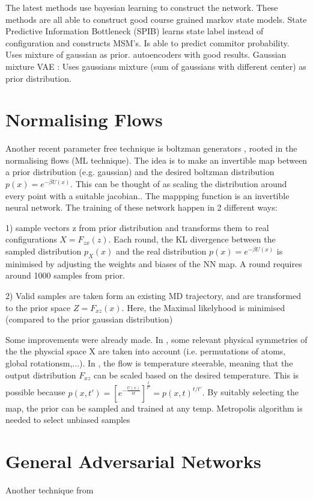\documentclass{article}
\begin{document}
The latest methods use bayesian learning to construct the network. These methods are all able to construct good course grained markov state models. State Predictive Information Bottleneck (SPIB) \cite{Wang2021} learns state label instead of configuration and constructs MSM's. Is able to predict commitor probability. Uses mixture of gaussian as prior. \cite{Shoberl2019} autoencoders with good results. Gaussian mixture VAE \cite{Bozkurt2020}: Uses gaussians mixture (sum of gaussians with different center) as prior distribution.

\section{Normalising Flows}\label{s:BG}

Another recent parameter free technique is boltzman generators \cite{Noe2019}, rooted in the normalising flows (ML technique). The idea is to make an invertible map between a prior distribution (e.g. gaussian) and the desired boltzman distribution $p(x)=e^{-\beta U(x)}$. This can be thought of as scaling the distribution around every point with a suitable jacobian.. The mappping function is an invertible neural network. The training of these network happen in 2 different ways:

1) sample vectors z from prior distribution and transforms them to real configurations $X=F_{zx}(z)$. Each round, the KL divergence between the sampled distribution $p_{X}(x)$ and the real distribution $p(x)=e^{-\beta U(x)}$ is minimised by adjusting the weights and biases of the NN map. A round requires around 1000 samples from prior.

2) Valid samples are taken form an existing MD trajectory, and are transformed to the prior space $Z = F_{xz}(x)$. Here, the Maximal likelyhood is minimised (compared to the prior gaussian distribution)

Some improvements were already made. In \cite{kohler2019}, some relevant physical symmetries of the the physcial space X are taken into account (i.e. permutations of atoms, global rotationsm,...). In \cite{Dibak2021}, the flow is temperature steerable, meaning that the output distribution $F_{xz}$ can be scaled based on the desired temperature. This is possible because $p(x,t') = [e^{-\frac{U(x)}{k t} } ]^{\frac{t}{t'}} =  p(x,t)^{t/t'} $. By suitably selecting the map, the prior can be sampled and trained at any temp. Metropolis algorithm is needed to select unbiased samples

\section{ General Adversarial Networks }
Another technique from
\end{document}
